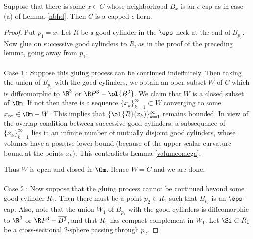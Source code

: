 \bigskip
\begin{lemma}
  \label{lem:kl-structure-at-first-singularity-time-existence-cap-geometry}

Suppose that there is some $x \in C$ whose neighborhood
$B_x$ is an $\epsilon$-cap as in case (a) of Lemma \ref{nbhd}.
Then $C$ is a capped $\epsilon$-horn.
\end{lemma}
\begin{proof}

Put $p_1=x$.  Let $R$ be a good cylinder in the $\eps$-neck
at the end of $B_{p_1}$.  Now glue on successive good cylinders
to $R$,
as in the proof of the preceding lemma,
going away from $p_1$. \\ \\
Case 1 :
Suppose this gluing process can be continued
indefinitely.  Then taking the union of $B_{p_1}$ with
the good cylinders, we obtain an open subset $W$ of $C$ which
is diffeomorphic to $\R^3$ or $\R P^3-\ol{B^3}$.
We claim that $W$ is a closed subset of $\Om$.
If not then there is a sequence $\{x_k\}_{k=1}^\infty
\subset W$ converging to some
$x_\infty\in \Om-W$. This implies that $\{\ol{R}(x_k)\}_{k=1}^\infty$
remains bounded. In view of the overlap condition between successive
good cylinders, a subsequence of
$\{x_k\}_{k=1}^\infty$ lies in an infinite
number of mutually disjoint good cylinders, whose volumes have a positive lower
bound (because of the upper scalar curvature bound at the points $x_k$).
This contradicts Lemma \ref{volumeomega}.

Thus $W$ is open and closed in $\Om$. Hence $W=C$ and
we are done. \\ \\
Case 2 :
Now suppose that the gluing process cannot be continued beyond some
good cylinder $R_1$.  Then there must be a point $p_2\in R_1$
such that $B_{p_2}$ is an $\eps$-cap. Also, note that
the union $W_1$ of $B_{p_1}$ with the good cylinders is diffeomorphic
to $\R^3$ or $\R P^3-\overline{B^3}$, and that $R_1$ has compact
complement in $W_1$.   Let $\Si\subset R_1$ be a cross-sectional $2$-sphere
passing through $p_2$.


\end{proof}
